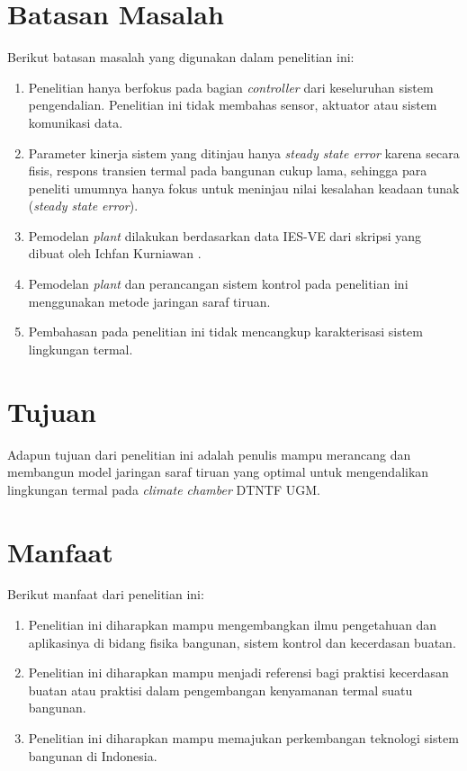 \section{Batasan Masalah}
Berikut batasan masalah yang digunakan dalam penelitian ini:
\begin{enumerate}
	\item Penelitian hanya berfokus pada bagian \textit{controller} dari keseluruhan sistem pengendalian. Penelitian ini tidak membahas sensor, aktuator atau sistem komunikasi data.
	\item Parameter kinerja sistem yang ditinjau hanya \textit{steady state error} karena secara fisis, respons transien termal pada bangunan cukup lama, sehingga para peneliti umumnya hanya fokus untuk meninjau nilai kesalahan keadaan tunak (\textit{steady state error}).
	\item Pemodelan \textit{plant} dilakukan berdasarkan data IES-VE dari skripsi yang dibuat oleh Ichfan Kurniawan \cite{skripsiIchfan}.	
	\item Pemodelan \textit{plant} dan perancangan sistem kontrol pada penelitian ini menggunakan metode jaringan saraf tiruan.
	\item Pembahasan pada penelitian ini tidak mencangkup karakterisasi sistem lingkungan termal.
\end{enumerate}

\section{Tujuan}
Adapun tujuan dari penelitian ini adalah penulis mampu merancang dan membangun model jaringan saraf tiruan yang optimal untuk mengendalikan lingkungan termal pada \textit{climate chamber} DTNTF UGM.

\section{Manfaat}
Berikut manfaat dari penelitian ini:
\begin{enumerate}
	\item Penelitian ini diharapkan mampu mengembangkan ilmu pengetahuan dan aplikasinya di bidang fisika bangunan, sistem kontrol dan kecerdasan buatan.
	\item Penelitian ini diharapkan mampu menjadi referensi bagi praktisi kecerdasan buatan atau praktisi dalam pengembangan kenyamanan termal suatu bangunan.
	\item Penelitian ini diharapkan mampu memajukan perkembangan teknologi sistem bangunan di Indonesia.
\end{enumerate}



